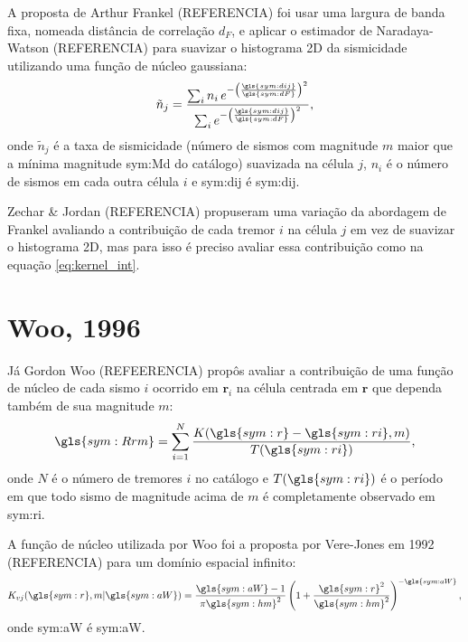 A proposta de Arthur Frankel (REFERENCIA) foi usar uma largura de banda fixa, 
nomeada distância de correlação $d_F$, e aplicar o estimador de Naradaya-Watson (REFERENCIA)
para suavizar o histograma 2D da sismicidade utilizando uma função de núcleo gaussiana:
\begin{equation}
	\ensuremath{
		\tilde{n}_j = \frac{ \sum_{i} n_i \,e^{ - \left(\frac{\gls{sym:dij}}{\gls{sym:dF}}\right)^2}}
						   { \sum_{i}     e^{ - \left(\frac{\gls{sym:dij}}{\gls{sym:dF}}\right)^2}},
	}
	\label{eq:ni}
\end{equation}
onde $\tilde{n}_j$ é a taxa de sismicidade (número de sismos com magnitude $m$ maior que a mínima magnitude
\gls{sym:Md} do catálogo) suavizada
na célula $j$, $n_i$ é o número de sismos em cada outra célula $i$ e
	\gls{sym:dij} é \glsdesc{sym:dij}.


Zechar \& Jordan (REFERENCIA) propuseram uma variação da abordagem de Frankel avaliando a contribuição
de cada tremor $i$ na célula $j$ em vez de suavizar o histograma 2D, mas para isso
é preciso avaliar essa contribuição como na equação \ref{eq:kernel_int}.


\section{Woo, 1996}
\label{sec:woo}

Já Gordon Woo (REFEERENCIA) propôs avaliar a contribuição de uma função de núcleo 
de cada sismo $i$ ocorrido em $\boldsymbol{r}_i$ 
na célula centrada em $\boldsymbol{r}$ que dependa também de sua
magnitude $m$:
\begin{equation}
	\ensuremath{
		\gls{sym:Rrm} = \sum_{i=1}^{N} \frac{ K(\gls{sym:r} - \gls{sym:ri}, m)}
											{T({\gls{sym:ri})}},
	}
	\label{eq:Rrm}
\end{equation}
onde $N$ é o número de tremores $i$ no catálogo 
e $T(\gls{sym:ri})$ é o período em que todo sismo de magnitude acima de $m$ é completamente observado 
em \gls{sym:ri}.

A função de núcleo utilizada por Woo foi a proposta por Vere-Jones em 1992 (REFERENCIA) 
para um domínio espacial infinito:
\begin{equation}
	\ensuremath{
		K_{vj}(\gls{sym:r}, m \arrowvert \gls{sym:aW}) =  \frac{  \gls{sym:aW}  -1}{\pi\gls{sym:hm}^2}
							\left( 1 + \frac{\gls{sym:r}^2}{\gls{sym:hm}^2} \right)^{-\gls{sym:aW}},
	}
	\label{eq:krm1}
\end{equation}
onde \gls{sym:aW} é \glsdesc{sym:aW}.

